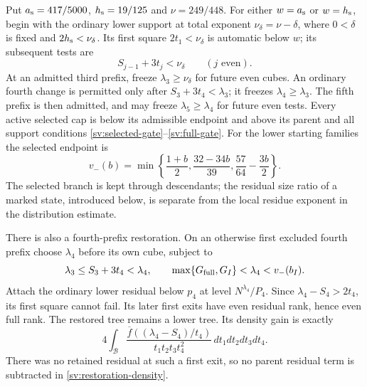 Put ${a_{\rm s}}=417/5000$, ${h_{\rm s}}=19/125$ and $\nu=249/448$.
For either $w={a_{\rm s}}$ or $w={h_{\rm s}}$, begin with the ordinary lower support
at total exponent $\nu_\delta=\nu-\delta$, where
$0<\delta$ is fixed and $2{h_{\rm s}}<\nu_\delta$.
Its first square $2t_1<\nu_\delta$ is automatic below $w$;
its subsequent tests are
\begin{equation}\label{sv:lower-cubes}
 S_{j-1}+3t_j<\nu_\delta\qquad(j\text{ even}).
\end{equation}
At an admitted third prefix, freeze $\lambda_3\ge\nu_\delta$
for future even cubes.  An ordinary fourth change is permitted only
after $S_3+3t_4<\lambda_3$; it freezes
$\lambda_4\ge\lambda_3$.  The fifth prefix is then admitted, and
may freeze $\lambda_5\ge\lambda_4$ for future even tests.
Every active selected cap is below its admissible endpoint and above
its parent and all support conditions \eqref{sv:selected-gate}--\eqref{sv:full-gate}.
For the lower starting families the selected endpoint is
\begin{equation}\label{sv:lower-endpoint}
 v_-(b)=\min\left\{\frac{1+b}{2},
 \frac{32-34b}{39},\frac{57}{64}-\frac{3b}{2}\right\}.
\end{equation}
The selected branch is kept through descendants; the residual size
ratio of a marked state, introduced below, is separate from the
local residue exponent in the distribution estimate.

There is also a fourth-prefix restoration.  On an otherwise first
excluded fourth prefix choose $\lambda_4$ before its own cube,
subject to
\begin{equation}\label{sv:restore-gates}
 \lambda_3\le S_3+3t_4<\lambda_4,
 \qquad \max\{G_{\rm full},G_I\}<\lambda_4<v_-(b_I).
\end{equation}
Attach the ordinary lower residual below $p_4$ at level
$N^{\lambda_4}/P_4$.  Since
$\lambda_4-S_4>2t_4$, its first square cannot fail.
Its later first exits have even residual rank, hence even full
rank.  The restored tree remains a lower tree.  Its density gain is
exactly
\begin{equation}\label{sv:restoration-density}
 4\int_{\mathcal B}
 \frac{\overline f((\lambda_4-S_4)/t_4)}
      {t_1t_2t_3t_4^2}\,dt_1dt_2dt_3dt_4.
\end{equation}
There was no retained residual at such a first exit, so no parent
residual term is subtracted in \eqref{sv:restoration-density}.

